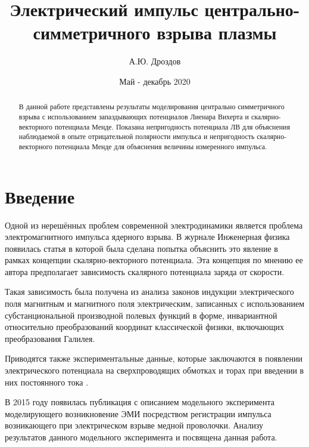 \documentclass[12pt]{article}
\begin{document}
\title{Электрический импульс центрально-симметричного взрыва плазмы}
\author{А.Ю. Дроздов}
\date{Май - декабрь 2020}

\begin{titlepage}
\maketitle
\end{titlepage}


\begin{abstract}
В данной работе представлены результаты моделирования центрально симметричного взрыва с использованием запаздывающих потенциалов Лиенара Вихерта и скалярно-векторного потенциала Менде. Показана непригодность потенциала ЛВ для объяснения наблюдаемой в опыте отрицательной полярности импульса и непригодность скалярно-векторного потенциала Менде для объяснения величины измеренного импульса.
\end{abstract}



\section{Введение}

Одной из нерешённых проблем современной электродинамики является проблема электромагнитного импульса ядерного взрыва. В журнале Инженерная физика появилась статья \cite{Mende2013} в которой была сделана попытка объяснить это явление в рамках концепции скалярно-векторного потенциала. Эта концепция по мнению ее автора предполагает зависимость скалярного потенциала заряда от скорости.

Такая зависимость была получена из анализа законов индукции электрического поля магнитным и магнитного поля электрическим, записанных с использованием субстанциональной производной полевых функций в форме, инвариантной относительно преобразований координат классической физики, включающих преобразования Галилея.

Приводятся также экспериментальные данные, которые заключаются в появлении электрического потенциала на сверхпроводящих обмотках и торах при введении в них постоянного тока \cite{Edwards1976} \cite{Roser1962} \cite{Baker1964} \cite{Mende1993}.

В 2015 году появилась публикация \cite{Mende2015} с описанием модельного эксперимента моделирующего возникновение ЭМИ посредством регистрации импульса возникающего при электрическом взрыве медной проволочки. Анализу результатов данного модельного эксперимента и посвящена данная работа.
\end{document}
